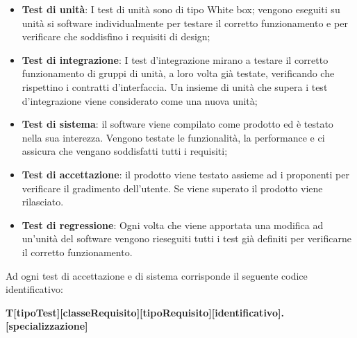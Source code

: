	\begin{itemize}
	    \item \textbf{Test di unità}: I test di unità sono di tipo White box; vengono eseguiti su unità si software individualmente per testare il corretto funzionamento e per verificare che soddisfino i requisiti di design;
	    \item \textbf{Test di integrazione}: I test d'integrazione mirano a testare il corretto funzionamento di gruppi di unità, a loro volta già testate, verificando che rispettino i contratti d'interfaccia. Un insieme di unità che supera i test d'integrazione viene considerato come una nuova unità;
	    \item \textbf{Test di sistema}: il software viene compilato come prodotto ed è testato nella sua interezza. Vengono testate le funzionalità, la performance e ci assicura che vengano soddisfatti tutti i requisiti;
	    \item \textbf{Test di accettazione}: il prodotto viene testato assieme ad i proponenti per verificare il gradimento dell'utente. Se viene superato il prodotto viene rilasciato.
	    \item \textbf{Test di regressione}: Ogni volta che viene apportata una modifica ad un'unità del software vengono rieseguiti tutti i test già definiti per verificarne il corretto funzionamento.
	\end{itemize}
	Ad ogni test di accettazione e di sistema corrisponde il seguente codice identificativo:\\
	
	\centerline{\textbf{T[tipoTest][classeRequisito][tipoRequisito][identificativo].[specializzazione]}}
	
